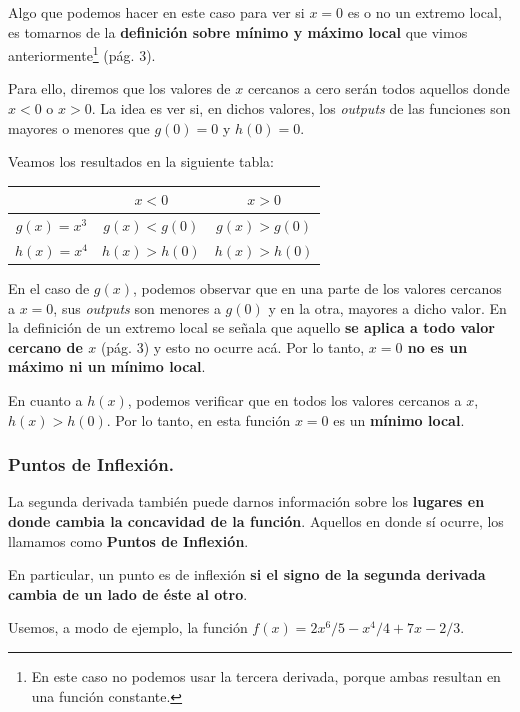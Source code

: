 \documentclass[12pt]{article}
\begin{document}
Algo que podemos hacer en este caso para ver si $x = 0$ es o no un extremo local, es tomarnos de la \textbf{definición sobre mínimo y máximo local} que vimos anteriormente\footnote{En este caso no podemos usar la tercera derivada, porque ambas resultan en una función constante.} (pág. 3).

Para ello, diremos que los valores de $x$ cercanos a cero serán todos aquellos donde $x < 0$ o $x > 0$. La idea es ver si, en dichos valores, los \textit{outputs} de las funciones son mayores o menores que $g(0) = 0$ y $h(0) = 0$.


Veamos los resultados en la siguiente tabla:

\begin{table}[hbt!]
\centering
{\renewcommand{\arraystretch}{1.3}
\begin{tabular}{c c c}
\hline
 & $x < 0$ & $x > 0$ \\
\hline
$g(x) = x^{3}$ & $g(x) < g(0)$ & $g(x) > g(0)$ \\
$h(x) = x^{4}$ & $h(x) > h(0)$ & $h(x) > h(0)$ \\
\hline
\end{tabular}
}
\end{table}

En el caso de $g(x)$, podemos observar que en una parte de los valores cercanos a $x = 0$, sus \textit{outputs} son menores a $g(0)$ y en la otra, mayores a dicho valor. En la definición de un extremo local se señala que aquello \textbf{se aplica a todo valor cercano de $x$} (pág. 3) y esto no ocurre acá. Por lo tanto, \textbf{$x = 0$ no es un máximo ni un mínimo local}.

En cuanto a $h(x)$, podemos verificar que en todos los valores cercanos a $x$, $h(x) > h(0)$. Por lo tanto, en esta función $x = 0$ es un \textbf{mínimo local}.


\subsubsection{Puntos de Inflexión.}

La segunda derivada también puede darnos información sobre los \textbf{lugares en donde cambia la concavidad de la función}. Aquellos en donde sí ocurre, los llamamos como \textbf{Puntos de Inflexión}.

En particular, un punto es de inflexión \textbf{si el signo de la segunda derivada cambia de un lado de éste al otro}.

Usemos, a modo de ejemplo, la función $f(x) = 2x^{6}/5 - x^{4}/4 + 7x - 2/3$.
\end{document}
